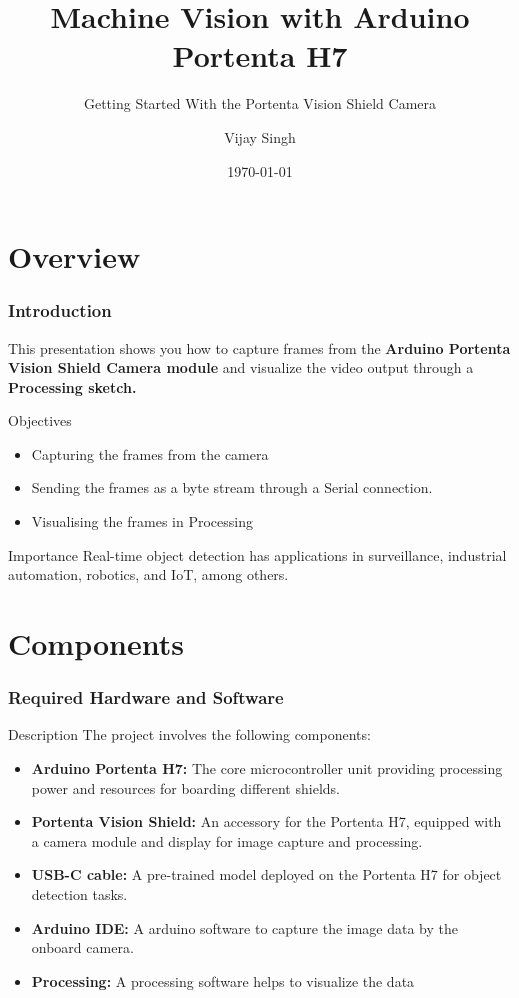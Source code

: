\documentclass[10pt, a4paper]{beamer}
\title{Machine Vision with Arduino Portenta H7}
\subtitle{Getting Started With the Portenta Vision Shield Camera}
\author{Vijay Singh}
\date{\today}
\begin{document}
	
	
	
	\section{Overview}
	\begin{frame}
		\frametitle{Introduction}
		
		\begin{block}{}
			This presentation shows you how to capture frames from the \textbf{Arduino Portenta Vision Shield Camera module} and visualize the video output through a \textbf{Processing sketch.}
		\end{block}
		
		
		\begin{block}{Objectives}
			\begin{itemize}
				\item Capturing the frames from the camera
				\item Sending the frames as a byte stream through a Serial connection.
				\item Visualising the frames in Processing
			\end{itemize}
		\end{block}
		
		\begin{block}{Importance}
			Real-time object detection has applications in surveillance, industrial automation, robotics, and IoT, among others.
		\end{block}
		
		
	\end{frame}
	
	\section{Components}
	\begin{frame}
		\frametitle{Required Hardware and Software}
		
		\begin{block}{Description}
			The project involves the following components:
			\begin{itemize}
				\item \textbf{Arduino Portenta H7:} The core microcontroller unit providing processing power and resources for boarding different shields.
				\item \textbf{Portenta Vision Shield:} An accessory for the Portenta H7, equipped with a camera module and display for image capture and processing.
				\item \textbf{USB-C cable:} A pre-trained model deployed on the Portenta H7 for object detection tasks.
				\item \textbf{Arduino IDE:} A arduino software to capture the image data by the onboard camera.
				\item \textbf{Processing:} A processing software helps to visualize the data
			\end{itemize}
		\end{block}
		
	\end{frame}
	
\end{document}
